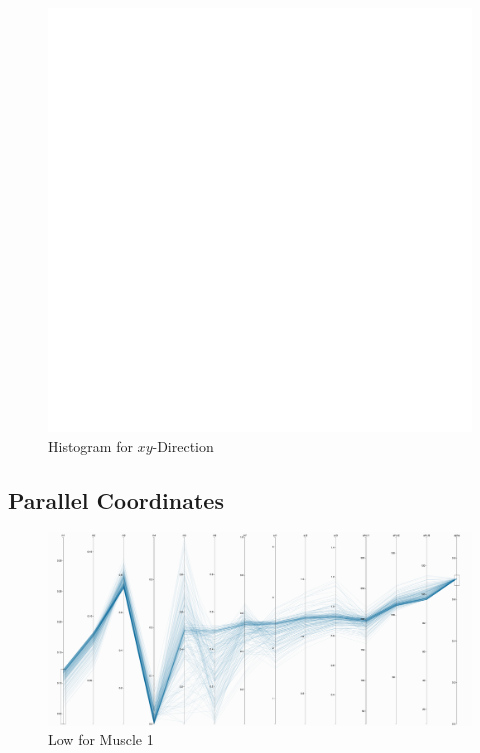 \begin{figure}[!H]
   \begin{center}
    \includegraphics[width=1.0\textwidth]{figs/XY_alphaProgression.pdf}
  \end{center}
  \caption{Histogram for $xy$-Direction}
  \label{fig_xyhisto}
\end{figure}

\subsection{Parallel Coordinates}

\begin{figure}[ht]
   \begin{center}
    \includegraphics[width=1.0\textwidth]{figs/X_a8_lower.png}
  \end{center}
  \caption{Low for Muscle 1}
  \label{fig_low}
\end{figure}

